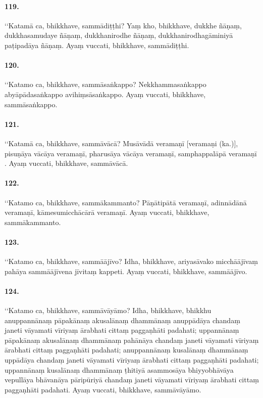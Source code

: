 \paragraph{119.} ‘‘Katamā ca, bhikkhave, sammādiṭṭhi? Yaṃ kho, bhikkhave, dukkhe ñāṇaṃ, dukkhasamudaye ñāṇaṃ, dukkhanirodhe ñāṇaṃ, dukkhanirodhagāminiyā paṭipadāya ñāṇaṃ. Ayaṃ vuccati, bhikkhave, sammādiṭṭhi.

\paragraph{120.} ‘‘Katamo ca, bhikkhave, sammāsaṅkappo? Nekkhammasaṅkappo abyāpādasaṅkappo avihiṃsāsaṅkappo. Ayaṃ vuccati, bhikkhave, sammāsaṅkappo.

\paragraph{121.} ‘‘Katamā ca, bhikkhave, sammāvācā? Musāvādā veramaṇī [veramaṇi (ka.)], pisuṇāya vācāya veramaṇī, pharusāya vācāya veramaṇī, samphappalāpā veramaṇī . Ayaṃ vuccati, bhikkhave, sammāvācā.

\paragraph{122.} ‘‘Katamo ca, bhikkhave, sammākammanto? Pāṇātipātā veramaṇī, adinnādānā veramaṇī, kāmesumicchācārā veramaṇī. Ayaṃ vuccati, bhikkhave, sammākammanto.

\paragraph{123.} ‘‘Katamo ca, bhikkhave, sammāājīvo? Idha, bhikkhave, ariyasāvako micchāājīvaṃ pahāya sammāājīvena jīvitaṃ kappeti. Ayaṃ vuccati, bhikkhave, sammāājīvo.

\paragraph{124.} ‘‘Katamo ca, bhikkhave, sammāvāyāmo? Idha, bhikkhave, bhikkhu anuppannānaṃ pāpakānaṃ akusalānaṃ dhammānaṃ anuppādāya chandaṃ janeti vāyamati vīriyaṃ ārabhati cittaṃ paggaṇhāti padahati; uppannānaṃ pāpakānaṃ akusalānaṃ dhammānaṃ pahānāya chandaṃ janeti vāyamati vīriyaṃ ārabhati cittaṃ paggaṇhāti padahati; anuppannānaṃ kusalānaṃ dhammānaṃ uppādāya chandaṃ janeti vāyamati vīriyaṃ ārabhati cittaṃ paggaṇhāti padahati; uppannānaṃ kusalānaṃ dhammānaṃ ṭhitiyā asammosāya bhiyyobhāvāya vepullāya bhāvanāya pāripūriyā chandaṃ janeti vāyamati vīriyaṃ ārabhati cittaṃ paggaṇhāti padahati. Ayaṃ vuccati, bhikkhave, sammāvāyāmo.

